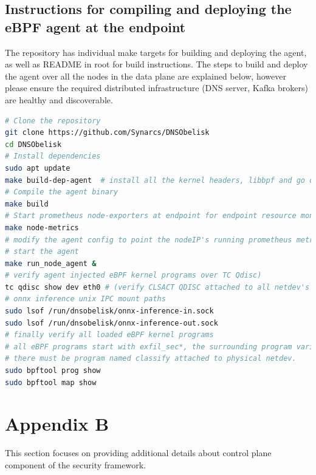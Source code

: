 \documentclass [11pt, proquest] {uwthesis}[2020/02/24]
\begin{document}
\subsection{Instructions for compiling and deploying the eBPF agent at the endpoint}
The repository has individual make targets for building and deploying the agent, as well as README in root for build instructions. The steps to build and deploy the agent over all the nodes in the data plane are explained below, however please ensure the required distributed infrastructure (DNS server, Kafka brokers) are healthy and discoverable.

{\footnotesize
\begin{lstlisting}[language=bash, 
    caption={Installation steps for eBPF agent at endpoint in data plane}, 
    label={lst:install-steps-dp},
    aboveskip=0.5em, 
    belowskip=0.5em
]
# Clone the repository
git clone https://github.com/Synarcs/DNSObelisk
cd DNSObelisk
# Install dependencies
sudo apt update 
make build-dep-agent  # install all the kernel headers, libbpf and go compiler and packages
# Compile the agent binary 
make build 
# Start prometheus node-exporters at endpoint for endpoint resource monitoring 
make node-metrics
# modify the agent config to point the nodeIP's running prometheus metric server, kafka brokers, grafana visualization server (node_agent/config.yaml).
# start the agent
make run_node_agent &
# verify agent injected eBPF kernel programs over TC Qdisc)
tc qdisc show dev eth0 # (verify CLSACT QDISC attached to all netdev's and bridge interfaces).
# onnx inference unix IPC mount paths 
sudo lsof /run/dnsobelisk/onnx-inference-in.sock  
sudo lsof /run/dnsobelisk/onnx-inference-out.sock
# finally verify all loaded eBPF kernel programs 
# all eBPF programs start with exfil_sec*, the surrounding program varies based on number of netdev's
# there must be program named classify attached to physical netdev.
sudo bpftool prog show  
sudo bpftool map show
\end{lstlisting}
}



\section{Appendix B}
This section focuses on providing additional details about control plane component of the security framework. 
\end{document}
